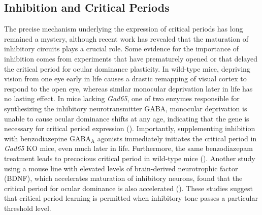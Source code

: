 \subsection{Inhibition and Critical Periods}
The precise mechanism underlying the expression of critical periods has long remained a mystery, although recent work has revealed that the maturation of inhibitory circuits plays a crucial role. Some evidence for the importance of inhibition comes from experiments that have prematurely opened or that delayed the critical period for ocular dominance plasticity. In wild-type mice, depriving vision from one eye early in life causes a drastic remapping of visual cortex to respond to the open eye, whereas similar monocular deprivation later in life has no lasting effect. In mice lacking \textit{Gad65}, one of two enzymes responsible for synthesizing the inhibitory neurotransmitter GABA, monocular deprivation is unable to cause ocular dominance shifts at any age, indicating that the gene is necessary for critical period expression (\cite{Fagiolini2000}). Importantly, supplementing inhibition with benzodiazepine GABA$_\mathrm{A}$ agonists immediately initiates the critical period in \textit{Gad65} KO mice, even much later in life. Furthermore, the same benzodiazepam treatment leads to precocious critical period in wild-type mice (\cite{Fagiolini2000}). Another study using a mouse line with elevated levels of brain-derived neurotrophic factor (BDNF), which accelerates maturation of inhibitory neurons, found that the critical period for ocular dominance is also accelerated (\cite{Hanover1999, Huang1999}). These studies suggest that critical period learning is permitted when inhibitory tone passes a particular threshold level.

